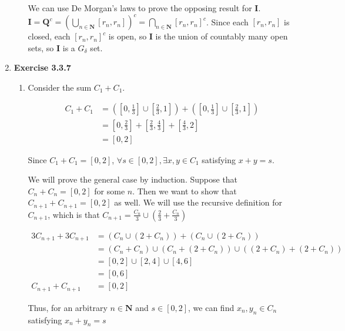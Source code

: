 \documentclass{article}
\begin{document}
\begin{enumerate}
\begin{enumerate}
        \smallskip

        We can use De Morgan's laws to prove the opposing result for $\mathbf{I}$. $\mathbf{I} = \mathbf{Q}^c = \left(\bigcup_{n\in \mathbf{N}} [r_n, r_n] \right)^c = \bigcap_{n \in \mathbf{N}} [r_n, r_n]^c$. Since each $[r_n, r_n]$ is closed, each $[r_n, r_n]^c$ is open, so $\mathbf{I}$ is the union of countably many open sets, so $\mathbf{I}$ is a $G_\delta$ set. 
     \end{enumerate}

     \item \textbf{Exercise 3.3.7}
     \begin{enumerate}
        \item Consider the sum $C_1 + C_1$.

        \begin{align*}
            C_1 + C_1 &= \left(\left[0, \frac{1}{3}\right] \cup \left[\frac{2}{3}, 1\right]\right) + \left(\left[0, \frac{1}{3}\right] \cup \left[\frac{2}{3}, 1\right]\right) \\
            &= \left[0, \frac{2}{3}\right] + \left[\frac{2}{3}, \frac{4}{3}\right] + \left[\frac{4}{3}, 2\right] \\ 
            &= \left[0, 2\right] 
        \end{align*}

        Since $C_1 + C_1 = [0, 2]$, $\forall s \in [0, 2], \exists x, y \in C_1$ satisfying $x + y = s$. 

        \smallskip

        We will prove the general case by induction. Suppose that $C_n + C_n = [0, 2]$ for some $n$. Then we want to show that $C_{n+1} + C_{n+1} = [0, 2]$ as well. We will use the recursive definition for $C_{n+1}$, which is that $C_{n+1} = \frac{C_n}{3} \cup \left(\frac{2}{3} + \frac{C_n}{3}\right)$

        \begin{align*}
            3C_{n+1} + 3C_{n+1} &= \left(C_n \cup (2 + C_n)\right) + \left(C_n \cup (2 + C_n)\right) \\
            &= \left(C_n + C_n\right) \cup \left(C_n + (2 + C_n)\right) \cup \left((2 + C_n) + (2 + C_n)\right) \\
            &= [0, 2] \cup [2, 4] \cup [4, 6] \\
            &= [0, 6] \\
            C_{n+1} + C_{n+1} &= [0, 2]
        \end{align*}

        Thus, for an arbitrary $n \in \mathbf{N}$ and $s \in [0, 2]$, we can find $x_n, y_n \in C_n$ satisfying $x_n + y_n = s$


\end{enumerate}
\end{enumerate}
\end{document}
